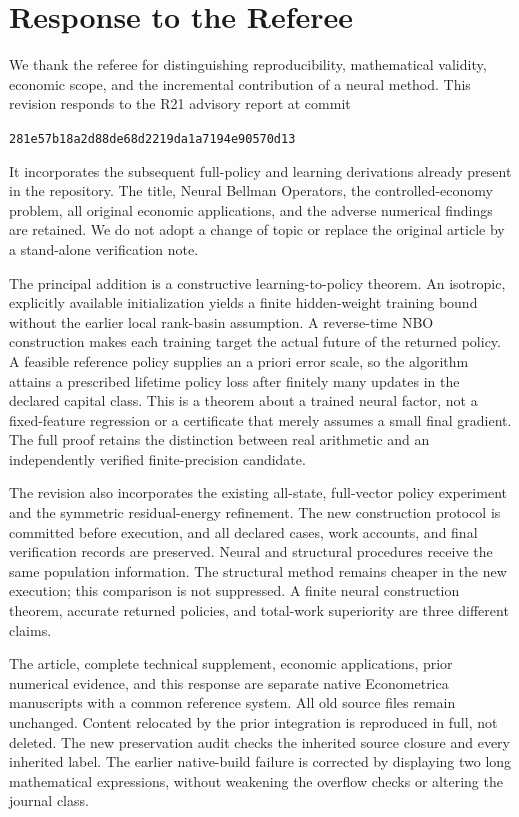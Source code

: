 \section*{Response to the Referee}
We thank the referee for distinguishing reproducibility, mathematical validity,
economic scope, and the incremental contribution of a neural method. This
revision responds to the R21 advisory report at commit
\begin{center}\small\texttt{281e57b18a2d88de68d2219da1a7194e90570d13}\end{center}
It incorporates the subsequent full-policy and learning derivations already present in the
repository. The title, Neural Bellman Operators, the controlled-economy
problem, all original economic applications, and the adverse numerical
findings are retained. We do not adopt a change of topic or replace the
original article by a stand-alone verification note.

The principal addition is a constructive learning-to-policy theorem. An
isotropic, explicitly available initialization yields a finite hidden-weight
training bound without the earlier local rank-basin assumption. A reverse-time
NBO construction makes each training target the actual future of the returned
policy. A feasible reference policy supplies an a priori error scale, so the
algorithm attains a prescribed lifetime policy loss after finitely many
updates in the declared capital class. This is a theorem about a trained
neural factor, not a fixed-feature regression or a certificate that merely
assumes a small final gradient. The full proof retains the distinction between
real arithmetic and an independently verified finite-precision candidate.

The revision also incorporates the existing all-state, full-vector policy
experiment and the symmetric residual-energy refinement. The new construction
protocol is committed before execution, and all declared cases, work accounts,
and final verification records are preserved. Neural and structural procedures
receive the same population information. The structural method remains
cheaper in the new execution; this comparison is not suppressed. A finite
neural construction theorem, accurate returned policies, and total-work
superiority are three different claims.

The article, complete technical supplement, economic applications, prior
numerical evidence, and this response are separate native Econometrica
manuscripts with a common reference system. All old source files remain
unchanged. Content relocated by the prior integration is reproduced in full,
not deleted. The new preservation audit checks the inherited source closure
and every inherited label. The earlier native-build failure is corrected by
displaying two long mathematical expressions, without weakening the overflow
checks or altering the journal class.

